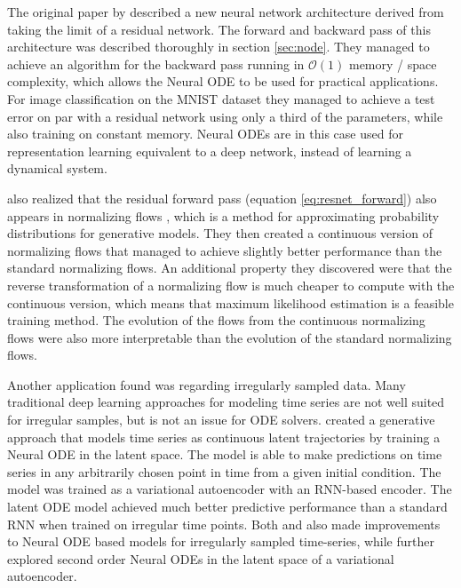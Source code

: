 \documentclass[12pt,a4paper]{book}
\begin{document}
The original paper by \cite{node} described a new neural network architecture derived from taking the limit of a residual network. The forward and backward pass of this architecture was described thoroughly in section \ref{sec:node}. They managed to achieve an algorithm for the backward pass running in $\mathcal{O}(1)$ memory / space complexity, which allows the Neural ODE to be used for practical applications. For image classification on the MNIST dataset they managed to achieve a test error on par with a residual network using only a third of the parameters, while also training on constant memory. Neural ODEs are in this case used for representation learning equivalent to a deep network, instead of learning a dynamical system.

\cite{node} also realized that the residual forward pass (equation \ref{eq:resnet_forward}) also appears in normalizing flows \citep{normalizingflows}, which is a method for approximating probability distributions for generative models. They then created a continuous version of normalizing flows that managed to achieve slightly better performance than the standard normalizing flows. An additional property they discovered were that the reverse transformation of a normalizing flow is much cheaper to compute with the continuous version, which means that maximum likelihood estimation is a feasible training method. The evolution of the flows from the continuous normalizing flows were also more interpretable than the evolution of the standard normalizing flows.

Another application found was regarding irregularly sampled data. Many traditional deep learning approaches for modeling time series are not well suited for irregular samples, but is not an issue for ODE solvers. \cite{node} created a generative approach that models time series as continuous latent trajectories by training a Neural ODE in the latent space. The model is able to make predictions on time series in any arbitrarily chosen point in time from a given initial condition. The model was trained as a variational autoencoder \citep{vae} with an RNN-based encoder. The latent ODE model achieved much better predictive performance than a standard RNN when trained on irregular time points. Both \cite{latentnode} and \cite{neuralcde} also made improvements to Neural ODE based models for irregularly sampled time-series, while \cite{ode2vae} further explored second order Neural ODEs in the latent space of a variational autoencoder.
\end{document}
